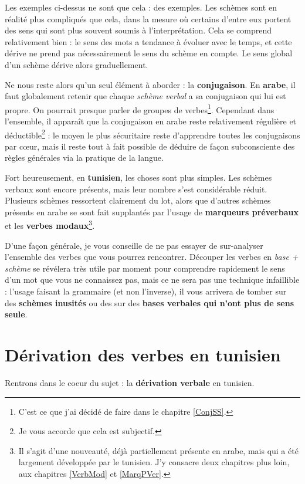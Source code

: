 Les exemples ci-dessus ne sont que cela : des exemples. Les schèmes sont en réalité plus compliqués que cela, dans la mesure où certains d'entre eux portent des sens qui sont plus souvent soumis à l'interprétation. Cela se comprend relativement bien : le sens des mots a tendance à évoluer avec le temps, et cette dérive ne prend pas nécessairement le sens du schème en compte. Le sens global d'un schème dérive alors graduellement.

Ne nous reste alors qu'un seul élément à aborder : la \textbf{conjugaison}. En \textbf{arabe}, il faut globalement retenir que chaque \textit{schème verbal} a sa conjugaison qui lui est propre. On pourrait presque parler de groupes de verbes\footnote{C'est ce que j'ai décidé de faire dans le chapitre \ref{ConjSS}.}. Cependant dans l'ensemble, il apparaît que la conjugaison en arabe reste relativement régulière et déductible\footnote{Je vous accorde que cela est subjectif.} : le moyen le plus sécuritaire reste d'apprendre toutes les conjugaisons par c\oe ur, mais il reste tout à fait possible de déduire de façon subconsciente des règles générales via la pratique de la langue. 

Fort heureusement, en \textbf{tunisien}, les choses sont plus simples. Les schèmes verbaux sont encore présents, mais leur nombre s'est considérable réduit.  Plusieurs schèmes ressortent clairement du lot, alors que d'autres schèmes  présents en arabe se sont fait supplantés par l'usage de \textbf{marqueurs préverbaux} et les \textbf{verbes modaux}\footnote{Il s'agit d'une nouveauté, déjà partiellement présente en arabe, mais qui a été largement développée par le tunisien. J'y consacre deux chapitres plus loin, aux chapitres \ref{VerbMod} et \ref{MarqPVer}.}.

D'une façon générale, je vous conseille de ne pas essayer de sur-analyser l'ensemble des verbes que vous pourrez rencontrer. Découper les verbes en \textit{base + schème} se révélera très utile par moment pour comprendre rapidement le sens d'un mot que vous ne connaissez pas, mais ce ne sera pas une technique infaillible : l'usage faisant la grammaire (et non l'inverse), il vous arrivera de tomber sur des \textbf{schèmes inusités} ou des sur des \textbf{bases verbales qui n'ont plus de sens seule}.

\section{Dérivation des verbes en tunisien}
Rentrons dans le coeur du sujet : la \textbf{dérivation verbale} en tunisien. 

